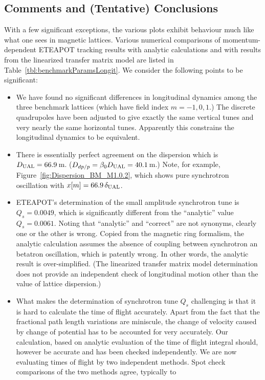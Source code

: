 \documentclass[]{article}
\begin{document}
\subsection{Comments and (Tentative) Conclusions}
With a few significant exceptions, the various plots exhibit 
behaviour much like what one sees in magnetic lattices.
Various numerical comparisons of momentum-dependent ETEAPOT tracking 
results with analytic calculations and with results from the linearized 
transfer matrix model are listed in Table~\ref{tbl:benchmarkParamsLongit}.
We consider the following points to be significant:
%
\begin{itemize}
\item
We have found no significant differences in longitudinal dynamics
among the three benchmark lattices (which have field index $m=-1,0,1$.)
The discrete quadrupoles have been adjusted to give exactly the
same vertical tunes and very nearly the same horizontal tunes. Apparently
this constrains the longitudinal dynamics to be equivalent.
\item
There is essentially perfect agreement on the dispersion
which is $D_{\rm UAL}=66.9\,$m. ($D_{dp/p}=\beta_0D_{\rm UAL}=40.1\,$m.)
Note, for example, Figure~\ref{fig:Dispersion_BM_M1.0.2}, which shows 
pure synchrotron oscillation with $x[m]=66.9\,\delta_{\rm UAL}$.
\item
ETEAPOT's determination of the small amplitude synchrotron tune 
is $Q_s=0.0049$, which is significantly different from the ``analytic''
value $Q_s=0.0061$. Noting that ``analytic'' and ``correct'' are not synonyms, 
clearly one or the other is wrong. Copied from the magnetic
ring formalism, the analytic calculation assumes the absence of coupling
between synchrotron an betatron oscillation, which is patently wrong.
In other words, the analytic result is over-simplified. (The linearized
transfer matrix model determination does not provide an independent 
check of longitudinal motion other than the value of lattice dispersion.)
\item
What makes the determination of synchrotron tune $Q_s$ challenging is that 
it is hard to calculate
the time of flight accurately.  Apart from the fact that the fractional
path length variations are miniscule, the change of velocity caused by
change of potential has to be accounted for very accurately. Our
calculation, based on analytic evaluation of the time of flight
integral should,
however be accurate and has been checked independently. 
We are now evaluating times of flight by two independent methods.
Spot check comparisons of the two methods agree, typically to

\end{itemize}
\end{document}

